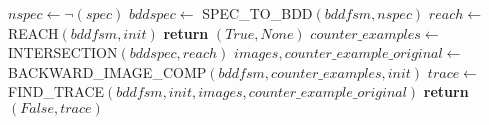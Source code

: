 \begin{appendices}
\begin{algorithmic}
        \medskip
        
            \State $nspec \leftarrow \neg(spec)$
            \State $bddspec \leftarrow$ SPEC\_TO\_BDD$(bddfsm, nspec)$
            \State $reach \leftarrow$ REACH$(bddfsm, init)$
                \State \textbf{return }$(True, None)$
            \Else
                \State $counter\_examples \leftarrow$ INTERSECTION$(bddspec, reach)$
                \State $images,counter\_example\_original \leftarrow$ \newline
                        \hspace*{5em}BACKWARD\_IMAGE\_COMP$(bddfsm, counter\_examples, init)$
                \State $trace \leftarrow$ \newline
                        \hspace*{5em}FIND\_TRACE$(bddfsm, init, images, counter\_example\_original)$
                \State \textbf{return }$(False, trace)$
            \EndIf
        \EndFunction
        \end{algorithmic}
  \end{appendices}